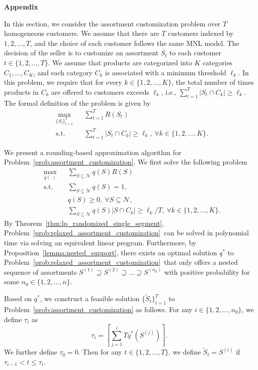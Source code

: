 \documentclass[msom,non-blindrev]{informs3} %
\theoremstyle{definition}
\begin{document}
\begin{appendices}{\Large \noindent\textbf{Appendix}}
{In this section, we consider the assortment customization problem over $T$ homogeneous customers. We assume that there are $T$ customers indexed by $1,2,\dots,T$, and the choice of each customer follows the same MNL model. The decision of the seller is to customize an assortment $S_t$ to each customer $t\in\{1,2,\dots,T\}$. We assume that products are categorized into $K$ categories $C_1,\dots,C_K$, and each category $C_k$ is associated with a minimum threshold $\ell_k$. In this problem, we require that for every $k\in\{1,2,\dots,K\}$, the total number of times products in $C_k$ are offered to customers exceeds $\ell_k$, i.e., $\sum_{t=1}^T|S_t\cap C_k|\geq \ell_k$. The formal definition of the problem is given by
\begin{equation}
\label{prob:assortment_customization}
\begin{aligned}
&\max_{\{S_t\}_{t=1}^T}&&\sum_{t=1}^TR(S_t)\\
&\text{s.t.}&& \sum_{t=1}^T|S_t\cap C_k|\geq \ell_k,\ \forall k\in\{1,2,\dots,K\}.
\end{aligned}
\end{equation}

We present a rounding-based approximation algorithm for Problem~\eqref{prob:assortment_customization}. We first solve the following problem
\begin{equation}
\label{prob:relaxed_assortment_customization}
\begin{aligned}
&\max_{q(\cdot)}&&\sum_{S\subseteq\mathcal{N}} q(S)R(S)\\
&\text{s.t.}&&\sum_{S\subseteq\mathcal{N}}q(S)=1,\\
&&&q(S)\geq 0,\ \forall S\subseteq\mathcal{N},\\
&&&\sum_{S\subseteq\mathcal{N}}q(S)|S\cap C_k|\geq \ell_k/T,\ \forall k\in\{1,2,\dots,K\}.
\end{aligned}
\end{equation}
By Theorem~\ref{thm:lp_randomized_single_segment}, Problem~\eqref{prob:relaxed_assortment_customization}~can be solved in polynomial time via solving an equivalent linear program. Furthermore, by Proposition~\ref{lemma:nested_support}, there exists an optimal solution $q^*$ to Problem~\eqref{prob:relaxed_assortment_customization}~that only offers a nested sequence of assortments $S^{(1)}\supseteq S^{(2)}\supseteq\dots\supseteq S^{(n_0)}$ with positive probability for some $n_0\in\{1,2,\dots,n\}$. 

Based on $q^*$, we construct a feasible solution $\{\tilde{S}_{t}\}_{t=1}^T$ to Problem~\eqref{prob:assortment_customization} as follows. For any $i\in \{1,2,\dots,n_0\}$, we define $\tau_i$ as
\begin{equation*}
\tau_i=\left\lceil \sum_{j=1}^i Tq^*(S^{(j)})\right\rceil.
\end{equation*}
We further define $\tau_0=0$. Then for any $t\in\{1,2,\dots,T\}$, we define $\tilde{S}_t=S^{(i)}$ if $\tau_{i-1}<t\leq \tau_{i}$.

}
\end{appendices}
\end{document}
